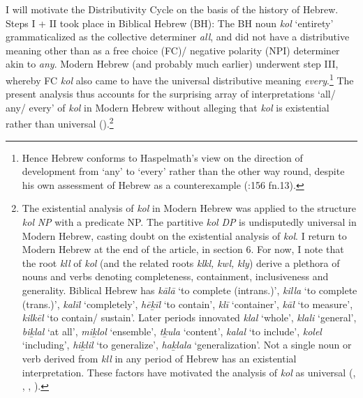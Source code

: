 \documentclass[output=paper]{langsci/langscibook}
\begin{document}
I will motivate the Distributivity Cycle on the basis of the history of Hebrew. Steps I + II took place in Biblical Hebrew (BH): The BH noun \textit{kol} ‘entirety’ grammaticalized as the collective determiner \textit{all}, and did not have a distributive meaning other than as a free choice (FC)/ negative polarity (NPI) determiner akin to \textit{any}. Modern Hebrew (and probably much earlier) underwent step III, whereby FC \textit{kol} also came to have the universal distributive meaning \textit{every}.\footnote{Hence Hebrew conforms to Haspelmath’s view on the direction of development from ‘any’ to ‘every’ rather than the other way round, despite his own assessment of Hebrew as a counterexample (\citealt{Haspelmath1997}:156 fn.13).}  The present analysis thus accounts for the surprising array of interpretations ‘all/ any/ every’ of \textit{kol} in Modern Hebrew without alleging that \textit{kol} is existential rather than universal (\citealt{LevMargulis2013}).\footnote{The existential analysis of \textit{kol} in Modern Hebrew was applied to the structure \textit{kol} \textit{NP} with a predicate NP. The partitive \textit{kol} \textit{DP} is undisputedly universal in Modern Hebrew, casting doubt on the existential analysis of \textit{kol}. I return to Modern Hebrew at the end of the article, in section 6. For now, I note that the root \textit{kll} of \textit{kol} (and the related roots \textit{klkl,} \textit{kwl,} \textit{kly}) derive a plethora of nouns and verbs denoting completeness, containment, inclusiveness and generality. Biblical Hebrew has \textit{kālā} ‘to complete (intrans.)’, \textit{killa} ‘to complete (trans.)’, \textit{kalīl} ‘completely’, \textit{hēḵīl} ‘to contain’, \textit{klī} ‘container’, \textit{kāl} ‘to measure’, \textit{kilkēl} ‘to contain/ sustain’. Later periods innovated \textit{klal} ‘whole’, \textit{klali} ‘general’, \textit{biḵlal} ‘at all’, \textit{miḵlol} ‘ensemble’, \textit{tḵula} ‘content’, \textit{kalal} ‘to include’, \textit{kolel} ‘including’, \textit{hiḵlil} ‘to generalize’, \textit{haḵlala} ‘generalization’. Not a single noun or verb derived from \textit{kll} in any period of Hebrew has an existential interpretation. These factors have motivated the analysis of \textit{kol} as universal (\citealt{DoronMittwoch1986}, \citealt{Glinert1989}, \citealt{FrancezGoldring2012}, \citealt{Danon2013}).}
\end{document}
